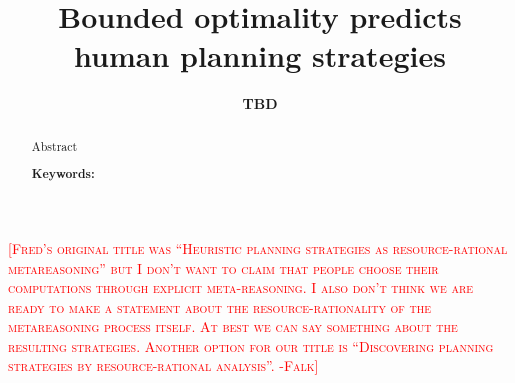 \documentclass[10pt,letterpaper]{article}
\title{Bounded optimality predicts human planning strategies}
\author{
  {\large \bf TBD}
  \AND {\large \bf TBD} 
  }
\newcommand{\fl}[1]{\textcolor{red}{\textsc{[#1 -Falk]}}}
\begin{document}
\maketitle
\fl{Fred's original title was ``Heuristic planning strategies as resource-rational metareasoning'' but I don't want to claim that people choose their computations through explicit meta-reasoning. I also don't think we are ready to make a statement about the resource-rationality of the metareasoning process itself. At best we can say something about the resulting strategies. Another option for our title is ``Discovering planning strategies by resource-rational analysis''.}

\begin{abstract}
Abstract

\textbf{Keywords:} 

\end{abstract}











\setlength{\bibleftmargin}{.125in}
\setlength{\bibindent}{-\bibleftmargin}


\end{document}
